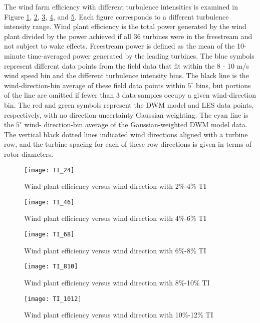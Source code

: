\documentclass{umthesis}
\begin{document}
The wind farm efficiency with different turbulence intensities is examined in Figure \ref{fig:TI_24}, \ref{fig:TI_46}, \ref{fig:TI_68}, \ref{fig:TI_810}, and \ref{fig:TI_1012}. Each figure corresponds to a different turbulence intensity range. Wind plant efficiency is the total power generated by the wind plant divided by the power achieved if all 36 turbines were in the freestream and not subject to wake effects. Freestream power is defined as the mean of the 10-minute time-averaged power generated by the leading turbines. The blue symbols represent different data points from the field data that fit within the 8 - 10 m/s wind speed bin and the different turbulence intensity bins. The black line is the wind-direction-bin average of these field data points within $5^\circ$ bins, but portions of the line are omitted if fewer than 3 data samples occupy a given wind-direction bin. The red and green symbols represent the DWM model and LES data points, respectively, with no direction-uncertainty Gaussian weighting. The cyan line is the $5^\circ$ wind- direction-bin average of the Gaussian-weighted DWM model data. The vertical black dotted lines indicated wind directions aligned with a turbine row, and the turbine spacing for each of these row directions is given in terms of rotor diameters.

\begin{figure}
  \centering
  \texttt{[image: TI\_24]}
  \caption{Wind plant efficiency versus wind direction with 2\%-4\% TI}\label{fig:TI_24}
\end{figure}

\begin{figure}
  \centering
  \texttt{[image: TI\_46]}
  \caption{Wind plant efficiency versus wind direction with 4\%-6\% TI}\label{fig:TI_46}
\end{figure}

\begin{figure}
  \centering
  \texttt{[image: TI\_68]}
  \caption{Wind plant efficiency versus wind direction with 6\%-8\% TI}\label{fig:TI_68}
\end{figure}

\begin{figure}
  \centering
  \texttt{[image: TI\_810]}
  \caption{Wind plant efficiency versus wind direction with 8\%-10\% TI}\label{fig:TI_810}
\end{figure}

\begin{figure}
  \centering
  \texttt{[image: TI\_1012]}
  \caption{Wind plant efficiency versus wind direction with 10\%-12\% TI}\label{fig:TI_1012}
\end{figure}
\end{document}
